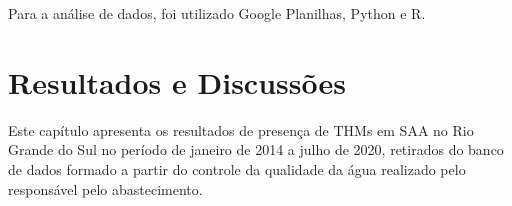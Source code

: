 Para a análise de dados, foi utilizado Google Planilhas, Python e R. 

\chapter{Resultados e Discussões}


%



Este capítulo apresenta os resultados de presença de THMs em SAA no Rio Grande do Sul no período de janeiro de 2014 a julho de 2020, retirados do banco de dados formado a partir do controle da qualidade da água realizado pelo responsável pelo abastecimento. 


